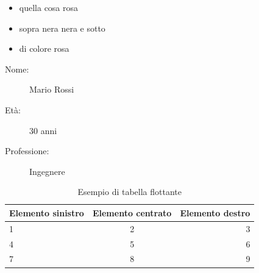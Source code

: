 \documentclass{article}
\begin{document}
\begin{itemize} %
    \item quella cosa rosa
    \item sopra nera nera e sotto
    \item di colore rosa
\end{itemize}

\begin{description}
    \item[Nome:] Mario Rossi
    \item[Età:] 30 anni
    \item[Professione:] Ingegnere
\end{description}

\begin{table}[ht]
    \centering
    \caption{Esempio di tabella flottante}
    \begin{tabular}{|l|c|r|}
        \hline
        Elemento sinistro & Elemento centrato & Elemento destro \\
        \hline
        1                 & 2                 & 3               \\
        4                 & 5                 & 6               \\
        7                 & 8                 & 9               \\
        \hline
    \end{tabular}
\end{table}
\end{document}
